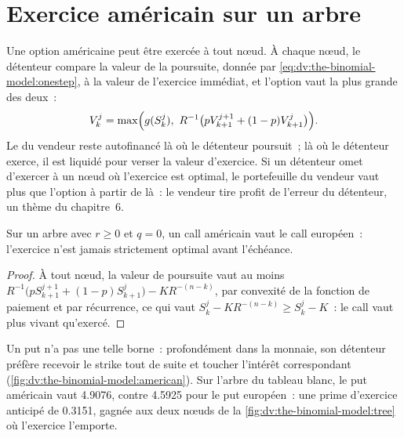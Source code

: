\section{Exercice américain sur un arbre}

Une option américaine peut être exercée à tout nœud. À chaque nœud, le détenteur compare
la valeur de la poursuite, donnée par \eqref{eq:dv:the-binomial-model:onestep}, à
la valeur de l'exercice immédiat, et l'option vaut la plus grande des deux~:
\[
V_k^j=\max\Bigl(g(S_k^j),\ R^{-1}\bigl(pV_{k+1}^{j+1}+(1-p)V_{k+1}^{j}\bigr)\Bigr).
\]
Le  du vendeur reste autofinancé là où le détenteur
poursuit~; là où le détenteur exerce, il est liquidé pour verser la
valeur d'exercice. Si un détenteur omet d'exercer à un nœud où l'exercice est optimal, le
portefeuille du vendeur vaut plus que l'option à partir de là~: le vendeur
tire profit de l'erreur du détenteur, un thème du chapitre~6.

\begin{proposition}\label{prop:dv:the-binomial-model:call}
Sur un arbre avec $r\ge0$ et $q=0$, un call américain vaut le call européen~:
l'exercice n'est jamais strictement optimal avant l'échéance.
\end{proposition}
\begin{proof}
À tout nœud, la valeur de poursuite vaut au moins
$R^{-1}\bigl(pS_{k+1}^{j+1}+(1-p)S_{k+1}^{j}\bigr)-KR^{-(n-k)}$, par convexité de la
fonction de paiement et par récurrence, ce qui vaut $S_k^j-KR^{-(n-k)}\ge S_k^j-K$~: le call
vaut plus vivant qu'exercé.
\end{proof}

Un put n'a pas une telle borne~: profondément dans la monnaie, son détenteur préfère
recevoir le strike tout de suite et toucher l'intérêt correspondant (\cref{fig:dv:the-binomial-model:american}).
Sur l'arbre du tableau blanc, le put américain vaut 4.9076, contre 4.5925 pour le
put européen~: une prime d'exercice anticipé de 0.3151, gagnée aux deux nœuds de la
\cref{fig:dv:the-binomial-model:tree} où l'exercice l'emporte.

